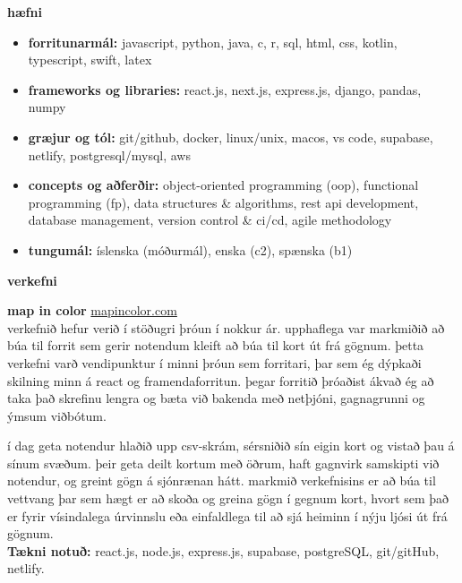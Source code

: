 \documentclass[11pt]{article}
\newcommand{\cvsection}[1]{\vspace{2em}\textbf{\large #1}\par\vspace{1em}}
\begin{document}
\cvsection{hæfni}
\begin{itemize}
  \item \textbf{forritunarmál:} javascript, python, java, c, r, sql, html, css, kotlin, typescript, swift, latex
  \item \textbf{frameworks og libraries:} react.js, next.js, express.js, django, pandas, numpy
  \item \textbf{græjur og tól:} git/github, docker, linux/unix, macos, vs code, supabase, netlify, postgresql/mysql, aws
  \item \textbf{concepts og aðferðir:} object-oriented programming (oop), functional programming (fp), data structures \& algorithms, rest api development, database management, version control \& ci/cd, agile methodology
  \item \textbf{tungumál:} íslenska (móðurmál), enska (c2), spænska (b1)
\end{itemize}

\newpage

\cvsection{verkefni}
\textbf{map in color} \hfill \href{https://mapincolor.com}{mapincolor.com}\\
verkefnið hefur verið í stöðugri þróun í nokkur ár. upphaflega var markmiðið að búa til forrit sem gerir notendum kleift að búa til kort út frá gögnum. þetta verkefni varð vendipunktur í minni þróun sem forritari, þar sem ég dýpkaði skilning minn á react og framendaforritun. þegar forritið þróaðist ákvað ég að taka það skrefinu lengra og bæta við bakenda með netþjóni, gagnagrunni og ýmsum viðbótum.

í dag geta notendur hlaðið upp csv-skrám, sérsniðið sín eigin kort og vistað þau á sínum svæðum. þeir geta deilt kortum með öðrum, haft gagnvirk samskipti við notendur, og greint gögn á sjónrænan hátt. markmið verkefnisins er að búa til vettvang þar sem hægt er að skoða og greina gögn í gegnum kort, hvort sem það er fyrir vísindalega úrvinnslu eða einfaldlega til að sjá heiminn í nýju ljósi út frá gögnum.\\
\textbf{Tækni notuð:} react.js, node.js, express.js, supabase, postgreSQL, git/gitHub, netlify.
\end{document}
